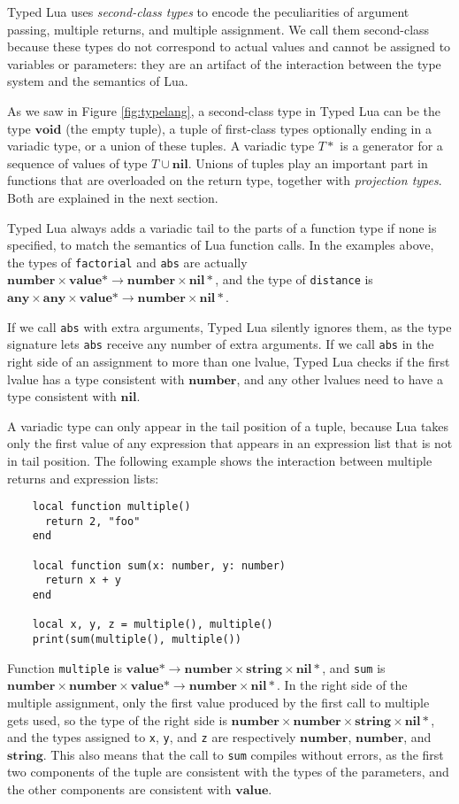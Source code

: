 \documentclass[preprint]{sig-alternate}
\newcommand{\Any}{\mathbf{any}}
\newcommand{\Top}{\mathbf{value}}
\newcommand{\Nil}{\mathbf{nil}}
\newcommand{\Number}{\mathbf{number}}
\newcommand{\String}{\mathbf{string}}
\newcommand{\Void}{\mathbf{void}}
\begin{document}
Typed Lua uses {\em second-class types} to encode the peculiarities
of argument passing, multiple returns, and multiple assignment. We call
them second-class because these types do not correspond to actual
values and cannot be assigned to variables or parameters: they are an
artifact of the interaction between the type system and the semantics of Lua.

As we saw in Figure \ref{fig:typelang}, a second-class type in
Typed Lua can be the type $\Void$ (the empty tuple),
a tuple of first-class types optionally ending in a variadic type,
or a union of these tuples. A variadic type $T*$ is a generator for a
sequence of values of type $T \cup \Nil$. Unions of tuples play
an important part in functions that are overloaded on the return type,
together with {\em projection types}. Both are explained in the next
section.

Typed Lua always adds a
variadic tail to the parts of a function type if none is specified, to match
the semantics of Lua function calls. In the examples above, the types
of {\tt factorial} and {\tt abs} are actually $\Number \times \Top *
 \rightarrow \Number \times \Nil *$, and the type of {\tt distance} is
$\Any \times \Any \times \Top * \rightarrow \Number \times \Nil *$.

If we call {\tt abs} with extra arguments, Typed Lua silently ignores
them, as the type signature lets {\tt abs} receive any number of extra
arguments. If we call {\tt abs} in the right side of an assignment to
more than one lvalue, Typed Lua checks if the first lvalue has a type
consistent with $\Number$, and any other lvalues need to have a type
consistent with $\Nil$.

A variadic type can only appear in the tail position of a tuple,
because Lua takes only the first value of any expression that appears
in an expression list that is not in tail position. The following example
shows the interaction between multiple returns and expression lists:

\begin{verbatim}
    local function multiple()
      return 2, "foo"
    end

    local function sum(x: number, y: number)
      return x + y
    end

    local x, y, z = multiple(), multiple()
    print(sum(multiple(), multiple())
\end{verbatim}

Function {\tt multiple} is
$\Top * \rightarrow \Number \times \String \times \Nil *$,
and {\tt sum} is $\Number \times \Number \times \Top * \rightarrow
\Number \times \Nil *$. In the right side of the multiple assignment,
only the first value produced by the first call to multiple gets used, so
the type of the right side is $\Number \times \Number \times \String \times \Nil*$,
and the types assigned to {\tt x}, {\tt y}, and {\tt z} are respectively $\Number$,
$\Number$, and $\String$. This also means that the call to {\tt sum} compiles
without errors, as the first two components of the tuple are consistent with
the types of the parameters, and the other components are consistent with
$\Top$.
\end{document}
